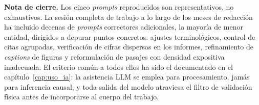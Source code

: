 \bigskip

\noindent\textbf{Nota de cierre.} Los cinco \textit{prompts} reproducidos
son representativos, no exhaustivos. La sesión completa de trabajo a lo
largo de los meses de redacción ha incluido decenas de \textit{prompts}
correctores adicionales, la mayoría de menor entidad, dirigidos a depurar
puntos concretos: ajustes terminológicos, control de citas agrupadas,
verificación de cifras dispersas en los informes, refinamiento de
\textit{captions} de figuras y reformulación de pasajes con densidad
expositiva inadecuada. El criterio común a todos ellos ha sido el
documentado en el capítulo~\ref{cap:uso_ia}: la asistencia LLM se
emplea para procesamiento, jamás para inferencia causal, y toda salida
del modelo atraviesa el filtro de validación física antes de
incorporarse al cuerpo del trabajo.